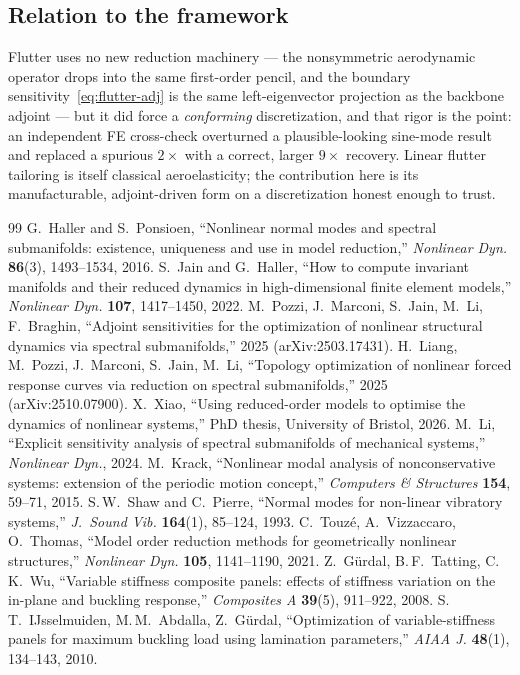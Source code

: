\documentclass[11pt]{article}
\begin{document}
\subsection{Relation to the framework}
Flutter uses no new reduction machinery --- the nonsymmetric aerodynamic operator drops into the same
first-order pencil, and the boundary sensitivity~\eqref{eq:flutter-adj} is the same left-eigenvector
projection as the backbone adjoint --- but it did force a \emph{conforming} discretization, and that
rigor is the point: an independent FE cross-check overturned a plausible-looking sine-mode result and
replaced a spurious $2\times$ with a correct, larger $9\times$ recovery. Linear flutter tailoring is
itself classical aeroelasticity; the contribution here is its manufacturable, adjoint-driven form on a
discretization honest enough to trust.


\begin{thebibliography}{99}
 G.\ Haller and S.\ Ponsioen, ``Nonlinear normal modes and
spectral submanifolds: existence, uniqueness and use in model reduction,''
\emph{Nonlinear Dyn.} \textbf{86}(3), 1493--1534, 2016.
 S.\ Jain and G.\ Haller, ``How to compute invariant manifolds
and their reduced dynamics in high-dimensional finite element models,''
\emph{Nonlinear Dyn.} \textbf{107}, 1417--1450, 2022.
 M.\ Pozzi, J.\ Marconi, S.\ Jain, M.\ Li, F.\ Braghin,
``Adjoint sensitivities for the optimization of nonlinear structural dynamics
via spectral submanifolds,'' 2025 (arXiv:2503.17431).
 H.\ Liang, M.\ Pozzi, J.\ Marconi, S.\ Jain, M.\ Li,
``Topology optimization of nonlinear forced response curves via reduction on
spectral submanifolds,'' 2025 (arXiv:2510.07900).
 X.\ Xiao, ``Using reduced-order models to optimise the
dynamics of nonlinear systems,'' PhD thesis, University of Bristol, 2026.
 M.\ Li, ``Explicit sensitivity analysis of spectral submanifolds
of mechanical systems,'' \emph{Nonlinear Dyn.}, 2024.
 M.\ Krack, ``Nonlinear modal analysis of nonconservative
systems: extension of the periodic motion concept,'' \emph{Computers \& Structures}
\textbf{154}, 59--71, 2015.
 S.\,W.\ Shaw and C.\ Pierre, ``Normal modes for non-linear
vibratory systems,'' \emph{J.\ Sound Vib.} \textbf{164}(1), 85--124, 1993.
 C.\ Touz\'e, A.\ Vizzaccaro, O.\ Thomas, ``Model order reduction
methods for geometrically nonlinear structures,'' \emph{Nonlinear Dyn.}
\textbf{105}, 1141--1190, 2021.
 Z.\ G\"urdal, B.\,F.\ Tatting, C.\,K.\ Wu, ``Variable stiffness
composite panels: effects of stiffness variation on the in-plane and buckling
response,'' \emph{Composites A} \textbf{39}(5), 911--922, 2008.
 S.\,T.\ IJsselmuiden, M.\,M.\ Abdalla, Z.\ G\"urdal,
``Optimization of variable-stiffness panels for maximum buckling load using
lamination parameters,'' \emph{AIAA J.} \textbf{48}(1), 134--143, 2010.
\end{thebibliography}
\end{document}

